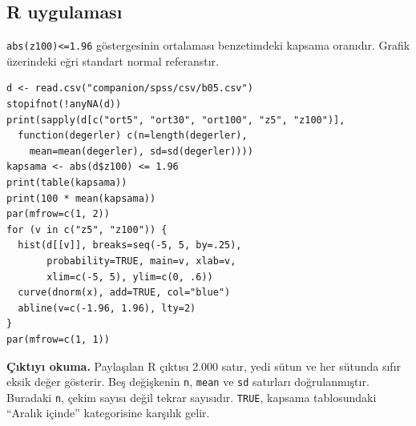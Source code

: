 \par\noindent\begin{minipage}{\linewidth}
\subsection{R uygulaması}
\label{sec:r-gercek-b05}

\texttt{abs(z100)<=1.96} göstergesinin ortalaması benzetimdeki kapsama oranıdır. Grafik üzerindeki eğri standart normal referanstır.

\begin{lstlisting}[style=prismR]
d <- read.csv("companion/spss/csv/b05.csv")
stopifnot(!anyNA(d))
print(sapply(d[c("ort5", "ort30", "ort100", "z5", "z100")],
  function(degerler) c(n=length(degerler),
    mean=mean(degerler), sd=sd(degerler))))
kapsama <- abs(d$z100) <= 1.96
print(table(kapsama))
print(100 * mean(kapsama))
par(mfrow=c(1, 2))
for (v in c("z5", "z100")) {
  hist(d[[v]], breaks=seq(-5, 5, by=.25),
       probability=TRUE, main=v, xlab=v,
       xlim=c(-5, 5), ylim=c(0, .6))
  curve(dnorm(x), add=TRUE, col="blue")
  abline(v=c(-1.96, 1.96), lty=2)
}
par(mfrow=c(1, 1))
\end{lstlisting}

\textbf{Çıktıyı okuma.} Paylaşılan R çıktısı 2.000 satır, yedi sütun
ve her sütunda sıfır eksik değer gösterir. Beş değişkenin \texttt{n},
\texttt{mean} ve \texttt{sd} satırları doğrulanmıştır. Buradaki
\texttt{n}, çekim sayısı değil tekrar sayısıdır. \texttt{TRUE}, kapsama
tablosundaki ``Aralık içinde'' kategorisine karşılık gelir.
\end{minipage}\par

